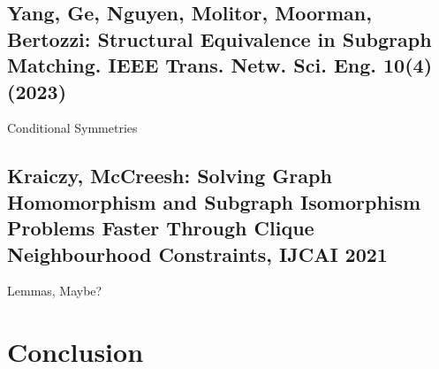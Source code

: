 \documentclass[aspectratio=169,compress,10pt]{beamer}
\begin{document}
\subsection{Yang, Ge, Nguyen, Molitor, Moorman, Bertozzi: Structural Equivalence in Subgraph Matching. IEEE Trans. Netw. Sci. Eng. 10(4) (2023)}

\begin{frame}{Conditional Symmetries}
\end{frame}

\subsection{Kraiczy, McCreesh: Solving Graph Homomorphism and Subgraph Isomorphism Problems Faster Through Clique Neighbourhood Constraints, IJCAI 2021}

\begin{frame}{Lemmas, Maybe?}
\end{frame}

\section{Conclusion}
\end{document}
